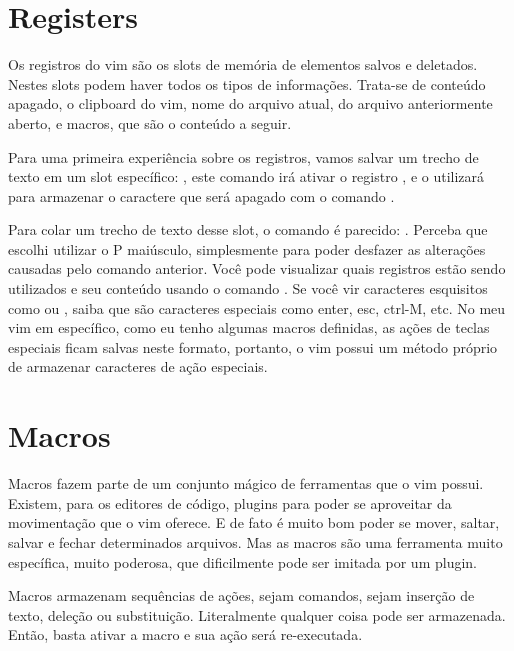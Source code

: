 
\section{Registers}
Os registros do vim são os slots de memória de elementos salvos e deletados.
Nestes slots podem haver todos os tipos de informações.
Trata-se de conteúdo apagado, o clipboard do vim, nome do arquivo atual, do arquivo anteriormente aberto,
e macros, que são o conteúdo a seguir.

Para uma primeira experiência sobre os registros, vamos salvar um trecho de texto
em um slot específico: , este comando irá ativar o registro , e
o utilizará para armazenar o caractere que será apagado com o comando .

Para colar um trecho de texto desse slot, o comando é parecido: .
Perceba que escolhi utilizar o P maiúsculo, simplesmente para poder desfazer as alterações causadas pelo comando anterior.
Você pode visualizar quais registros estão sendo utilizados e seu conteúdo usando o comando .
Se você vir caracteres esquisitos como  ou \vimkeys{\^}, saiba que são caracteres especiais como 
enter, esc, ctrl-M, etc.
No meu vim em específico, como eu tenho algumas macros definidas, as ações de teclas especiais ficam salvas neste formato,
portanto, o vim possui um método próprio de armazenar caracteres de ação especiais.


\section{Macros}
Macros fazem parte de um conjunto mágico de ferramentas que o vim possui.
Existem, para os editores de código, plugins para poder se aproveitar da movimentação que o vim oferece.
E de fato é muito bom poder se mover, saltar, salvar e fechar determinados arquivos.
Mas as macros são uma ferramenta muito específica, muito poderosa, que dificilmente pode ser imitada por um plugin.

Macros armazenam sequências de ações, sejam comandos, sejam inserção de texto, deleção ou substituição.
Literalmente qualquer coisa pode ser armazenada. Então, basta ativar a macro e sua ação será re-executada.

